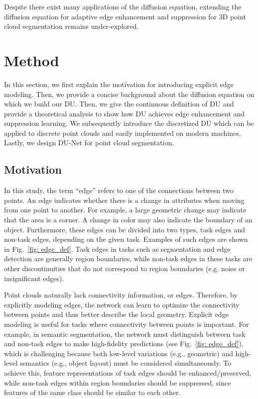 \documentclass[a4paper,fleqn]{cas-dc}
\begin{document}
Despite there exist many applications of the diffusion equation, extending the diffusion equation for adaptive edge enhancement and suppression for 3D point cloud segmentation remains under-explored. 

\section{Method}
\label{sec:method}
In this section, we first explain the motivation for introducing explicit edge modeling. Then, we provide a concise background about the diffusion equation on which we build our DU. 
Then, we give the continuous definition of DU and provide a theoretical analysis to show how DU achieves edge enhancement and suppression learning.
We subsequently introduce the discretized DU which can be applied to discrete point clouds and easily implemented on modern machines. 
Lastly, we design DU-Net for point cloud segmentation. 

\subsection{Motivation}
In this study, the term ``edge'' refers to one of the connections between two points. An edge indicates whether there is a change in attributes when moving from one point to another. For example, a large geometric change may indicate that the area is a corner. A change in color may also indicate the boundary of an object. Furthermore, these edges can be divided into two types, task edges and non-task edges, depending on the given task. Examples of such edges are shown in Fig.~\ref{fig: edge_def}. Task edges in tasks such as segmentation and edge detection are generally region boundaries, while non-task edges in these tasks are other discontinuities that do not correspond to region boundaries (e.g. noise or insignificant edges).

Point clouds naturally lack connectivity information, or edges. Therefore, by explicitly modeling edges, the network can learn to optimize the connectivity between points and thus better describe the local geometry. Explicit edge modeling is useful for tasks where connectivity between points is important. For example, in semantic segmentation, the network must distinguish between task and non-task edges to make high-fidelity predictions (see Fig.~\ref{fig: edge_def}), which is challenging because both low-level variations (e.g., geometric) and high-level semantics (e.g., object layout) must be considered simultaneously. To achieve this, feature representations of task edges should be enhanced/preserved, while non-task edges within region boundaries should be suppressed, since features of the same class should be similar to each other.
\end{document}
